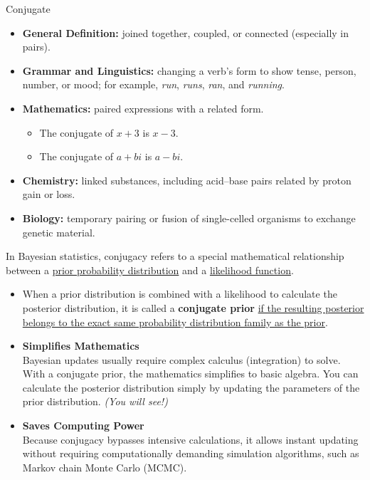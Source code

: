 \documentclass[aspectratio=43,11pt]{beamer}
\begin{document}
  \begin{frame}{Conjugate}
    \begin{itemize}
      \item \textbf{General Definition:} joined together, coupled, or connected (especially in pairs).
      \item \textbf{Grammar and Linguistics:} changing a verb's form to show tense, person, number, or mood; for example, \emph{run}, \emph{runs}, \emph{ran}, and \emph{running}.
      \item \textbf{Mathematics:} paired expressions with a related form.
      \begin{itemize}
        \item The conjugate of $x+3$ is $x-3$.
        \item The conjugate of $a+bi$ is $a-bi$.
      \end{itemize}
      \item \textbf{Chemistry:} linked substances, including acid--base pairs related by proton gain or loss.
      \item \textbf{Biology:} temporary pairing or fusion of single-celled organisms to exchange genetic material.
    \end{itemize}
  \end{frame}

  \begin{frame}{}
    In Bayesian statistics, conjugacy refers to a special mathematical relationship between a \ul{prior probability distribution} and a \ul{likelihood function}.
    \begin{itemize}
      \item When a prior distribution is combined with a likelihood to calculate the posterior distribution, it is called a \textbf{conjugate prior} \ul{if the resulting posterior belongs to the exact same probability distribution family as the prior}.
    \end{itemize}
  \end{frame}

  \begin{frame}{}
    \begin{itemize}
      \item \textbf{Simplifies Mathematics}\\Bayesian updates usually require complex calculus (integration) to solve.
      With a conjugate prior, the mathematics simplifies to basic algebra. You can calculate the posterior distribution simply by updating the parameters of the prior distribution. {\it (You will see!)}
      \item \textbf{Saves Computing Power}\\Because conjugacy bypasses intensive calculations, it allows instant updating without requiring computationally demanding simulation algorithms, such as Markov chain Monte Carlo (MCMC).
    \end{itemize}
  \end{frame}
\end{document}
